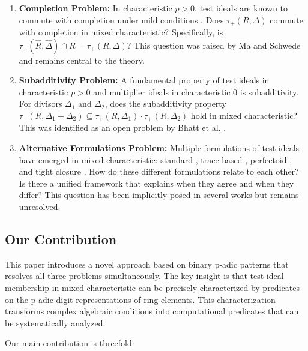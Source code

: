 \begin{enumerate}
    \item \textbf{Completion Problem:} In characteristic $p > 0$, test ideals are known to commute with completion under mild conditions \cite{HY03}. Does $\tau_+(R,\Delta)$ commute with completion in mixed characteristic? Specifically, is $\tau_+(\hat{R},\hat{\Delta}) \cap R = \tau_+(R,\Delta)$? This question was raised by Ma and Schwede \cite{MS18} and remains central to the theory.
    
    \item \textbf{Subadditivity Problem:} A fundamental property of test ideals in characteristic $p > 0$ \cite{HY03} and multiplier ideals in characteristic 0 \cite{Laz04} is subadditivity. For divisors $\Delta_1$ and $\Delta_2$, does the subadditivity property $\tau_+(R,\Delta_1+\Delta_2) \subseteq \tau_+(R,\Delta_1) \cdot \tau_+(R,\Delta_2)$ hold in mixed characteristic? This was identified as an open problem by Bhatt et al. \cite{BMPSTWW20}.
    
    \item \textbf{Alternative Formulations Problem:} Multiple formulations of test ideals have emerged in mixed characteristic: standard \cite{MS18}, trace-based \cite{MR18}, perfectoid \cite{AMBT19}, and tight closure \cite{BMP+23}. How do these different formulations relate to each other? Is there a unified framework that explains when they agree and when they differ? This question has been implicitly posed in several works but remains unresolved.
\end{enumerate}

\subsection{Our Contribution}

This paper introduces a novel approach based on binary p-adic patterns that resolves all three problems simultaneously. The key insight is that test ideal membership in mixed characteristic can be precisely characterized by predicates on the p-adic digit representations of ring elements. This characterization transforms complex algebraic conditions into computational predicates that can be systematically analyzed.

Our main contribution is threefold:

